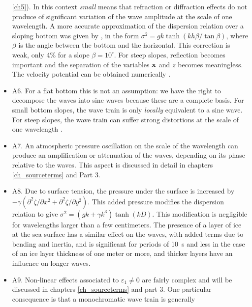 \begin{itemize}
  \ref{ch5}). In this context \emph{small} means that refraction or diffraction effects do not produce of significant variation 
of the wave amplitude at the scale of one wavelength. A more accurate approximation of the dispersion relation 
over a sloping bottom was given by 
   \cite{Ehrenmark2005}, in the form 
   $\sigma^2=gk \tanh(kh \beta /\tan \beta)$, where $\beta$ is the angle between the bottom and the horizontal. This correction is 
weak, only 4\% for a slope $\beta=10^\circ$. For steep slopes, reflection becomes important and the separation of the 
variables $\mathbf{x}$ and $z$ becomes meaningless. The velocity potential can be obtained numerically 
  \citep[e.g.][]{Athanassoulis&Belibassakis1999,Belibassakis&al.2001}.\vspace{0.3cm}
  \item A6. For a flat bottom this is not an assumption: we have the right to decompose the waves into sine waves because these 
are a complete basis. For small bottom slopes, the wave train is only \emph{locally} equivalent to a sine wave. 
For steep slopes, the wave train can suffer strong distortions at the scale of one wavelength \citep[e.g.][]{Magne&al.2007}.\vspace{0.3cm}
  \item A7. An atmospheric pressure oscillation on the scale of the wavelength can produce an amplification or attenuation of the waves, depending 
on its phase relative to the waves. This aspect is discussed in detail in chapters \ref{ch_sourceterms} and Part 3. \vspace{0.3cm}
  \item A8. Due to surface tension, the pressure under the surface is increased by  $-\gamma \left(\partial^2 \zeta/\partial x^2+\partial^2 \zeta/\partial
  y^2\right)$. This added pressure modifies the dispersion relation to give $\sigma^2=\left(gk+\gamma k^3\right) \tanh(kD)$. 
  This modification is negligible for wavelengths larger than a few centimeters. The presence of a layer of ice at the sea surface 
has a similar effect on the waves, with added terms due to bending and inertia, and is significant for periods of 10~s and 
less \citep{Liu&MolloChristensen1988} in the case of an ice layer thickness of one meter or more, and  thicker layers have an influence on longer waves.
  \item A9. Non-linear effects associated to $\varepsilon_1 \neq 0$ are fairly complex and will be 
discussed in chapters \ref{ch_sourceterms} and part 3. 
One particular consequence is that a monochromatic wave train is generally 

\end{itemize}
